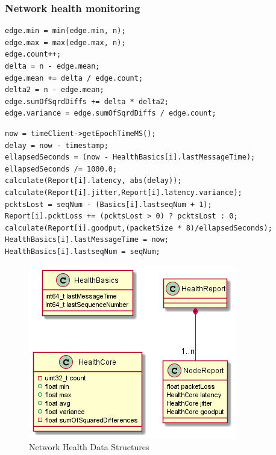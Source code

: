 \documentclass[letterpaper,twocolumn,12pt]{article}
\begin{document}
\subsubsection{Network health monitoring}\label{sec:nethealth}

\begin{lstlisting}[caption=
    {calculate\_health(HealthCore \&edge, n)},label=code:calc, float=t]
edge.min = min(edge.min, n);
edge.max = max(edge.max, n);
edge.count++;
delta = n - edge.mean;
edge.mean += delta / edge.count;
delta2 = n - edge.mean;
edge.sumOfSqrdDiffs += delta * delta2;
edge.variance = edge.sumOfSqrdDiffs / edge.count;
\end{lstlisting}

\begin{lstlisting}[caption={update\_health(ind, packetsz, ts, seq)},label=code:update, float=t] 
now = timeClient->getEpochTimeMS();
delay = now - timestamp;
ellapsedSeconds = (now - HealthBasics[i].lastMessageTime);
ellapsedSeconds /= 1000.0;
calculate(Report[i].latency, abs(delay));
calculate(Report[i].jitter,Report[i].latency.variance);
pcktsLost = seqNum - (Basics[i].lastseqNum + 1);
Report[i].pcktLoss += (pcktsLost > 0) ? pcktsLost : 0;
calculate(Report[i].goodput,(packetSize * 8)/ellapsedSeconds);
HealthBasics[i].lastMessageTime = now;
HealthBasics[i].lastseqNum = seqNum;
\end{lstlisting}

\begin{figure}[]
    \centering
    \includegraphics[width=\linewidth]{out/images/network_health/network_health.png}
    \caption{Network Health Data Structures}
    \label{fig:network_health_ds}
\end{figure}
\end{document}
